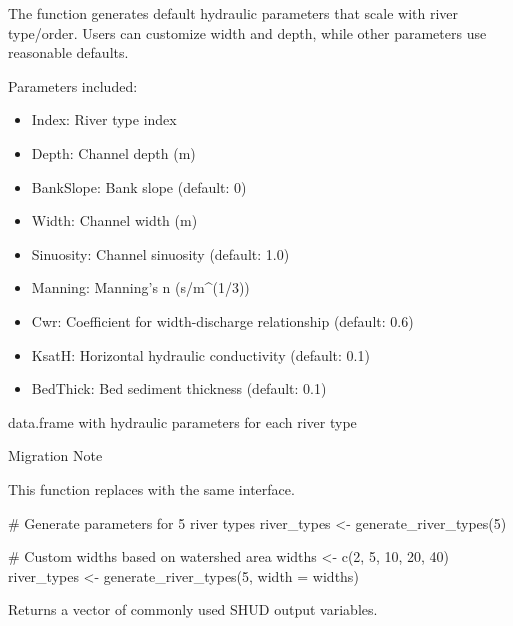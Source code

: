 \documentclass[a4paper]{book}
\begin{document}
%
\begin{Details}\relax
The function generates default hydraulic parameters that scale with river
type/order. Users can customize width and depth, while other parameters
use reasonable defaults.

Parameters included:
\begin{itemize}

\item{} Index: River type index
\item{} Depth: Channel depth (m)
\item{} BankSlope: Bank slope (default: 0)
\item{} Width: Channel width (m)
\item{} Sinuosity: Channel sinuosity (default: 1.0)
\item{} Manning: Manning's n (s/m\textasciicircum{}(1/3))
\item{} Cwr: Coefficient for width-discharge relationship (default: 0.6)
\item{} KsatH: Horizontal hydraulic conductivity (default: 0.1)
\item{} BedThick: Bed sediment thickness (default: 0.1)

\end{itemize}

\end{Details}
%
\begin{Value}
data.frame with hydraulic parameters for each river type
\end{Value}
%
\begin{Section}{Migration Note}

This function replaces  with the same interface.
\end{Section}
%
\begin{Examples}
\begin{ExampleCode}
# Generate parameters for 5 river types
river_types <- generate_river_types(5)

# Custom widths based on watershed area
widths <- c(2, 5, 10, 20, 40)
river_types <- generate_river_types(5, width = widths)
\end{ExampleCode}
\end{Examples}
%
\begin{Description}\relax
Returns a vector of commonly used SHUD output variables.
\end{Description}
\end{document}

